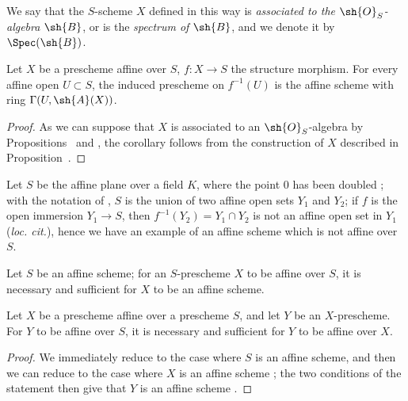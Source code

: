 We say that the $S$-scheme $X$ defined in this way is \emph{associated to the $\sh{O}_S$-algebra $\sh{B}$}, or is the \emph{spectrum of $\sh{B}$}, and we denote it by $\Spec(\sh{B})$.

\begin{corollary}[1.3.2]
\label{2.1.3.2}
Let $X$ be a prescheme affine over $S$, $f:X\to S$ the structure morphism.
For every affine open $U\subset S$, the induced prescheme on $f^{-1}(U)$ is the affine scheme with ring $\Gamma(U,\sh{A}(X))$.
\end{corollary}

\begin{proof}
\label{proof-2.1.3.2}
As we can suppose that $X$ is associated to an $\sh{O}_S$-algebra by Propositions~ and , the corollary follows from the construction of $X$ described in Proposition~.
\end{proof}

\begin{example}[1.3.3]
\label{2.1.3.3}
Let $S$ be the affine plane over a field $K$, where the point $0$ has been doubled ; with the notation of , $S$ is the union of two affine open sets $Y_1$ and $Y_2$; if $f$ is the open immersion $Y_1\to S$, then $f^{-1}(Y_2)=Y_1\cap Y_2$ is not an affine open set in $Y_1$ (\emph{loc. cit.}), hence we have an example of an affine scheme which is not affine over $S$.
\end{example}

\begin{corollary}[1.3.4]
\label{2.1.3.4}
Let $S$ be an affine scheme; for an $S$-prescheme $X$ to be affine over $S$, it is necessary and sufficient for $X$ to be an affine scheme.
\end{corollary}

\begin{corollary}[1.3.5]
\label{2.1.3.5}
Let $X$ be a prescheme affine over a prescheme $S$, and let $Y$ be an $X$-prescheme.
For $Y$ to be affine over $S$, it is necessary and sufficient for $Y$ to be affine over $X$.
\end{corollary}

\begin{proof}
\label{proof-2.1.3.5}
We immediately reduce to the case where $S$ is an affine scheme, and then we can reduce to the case where $X$ is an affine scheme ; the two conditions of the statement then give that $Y$ is an affine scheme .
\end{proof}

